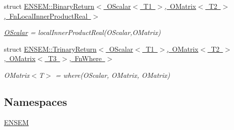 \begin{DoxyCompactItemize}
struct \mbox{\hyperlink{structENSEM_1_1BinaryReturn_3_01OScalar_3_01T1_01_4_00_01OMatrix_3_01T2_01_4_00_01FnLocalInnerProductReal_01_4}{E\+N\+S\+E\+M\+::\+Binary\+Return$<$ O\+Scalar$<$ T1 $>$, O\+Matrix$<$ T2 $>$, Fn\+Local\+Inner\+Product\+Real $>$}}
\begin{DoxyCompactList}\small\item\em \mbox{\hyperlink{classENSEM_1_1OScalar}{O\+Scalar}} = local\+Inner\+Product\+Real(\+O\+Scalar,\+O\+Matrix) \end{DoxyCompactList}\item 
struct \mbox{\hyperlink{structENSEM_1_1TrinaryReturn_3_01OScalar_3_01T1_01_4_00_01OMatrix_3_01T2_01_4_00_01OMatrix_3_01T3_01_4_00_01FnWhere_01_4}{E\+N\+S\+E\+M\+::\+Trinary\+Return$<$ O\+Scalar$<$ T1 $>$, O\+Matrix$<$ T2 $>$, O\+Matrix$<$ T3 $>$, Fn\+Where $>$}}
\begin{DoxyCompactList}\small\item\em O\+Matrix$<$\+T$>$ = where(\+O\+Scalar, O\+Matrix, O\+Matrix) \end{DoxyCompactList}\end{DoxyCompactItemize}
\subsection*{Namespaces}
\begin{DoxyCompactItemize}
\item 
 \mbox{\hyperlink{namespaceENSEM}{E\+N\+S\+EM}}
\end{DoxyCompactItemize}
